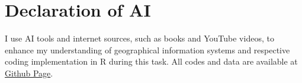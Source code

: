 \documentclass[11pt]{article}
\begin{document}
\section{Declaration of AI}
I use AI tools and internet sources, such as books and YouTube videos, to enhance my understanding of geographical information systems and respective coding implementation in R during this task. All codes and data are available at \href{https://github.com/YingYan77/thailand-conflict}{Github Page}. 

\printbibliography
\end{document}
